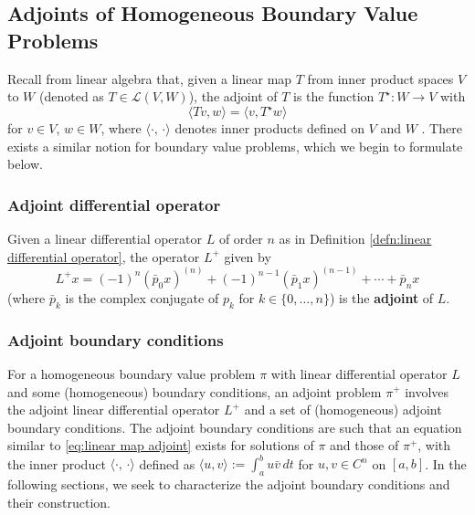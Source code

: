 \documentclass[11pt, oneside, a4paper]{article}
\begin{document}
\subsection{Adjoints of Homogeneous Boundary Value Problems}\label{sec:adjoints_of_homogeneous_BVPs}

Recall from linear algebra that, given a linear map $T$ from inner product spaces $V$ to $W$ (denoted as $T\in\mathcal{L}(V,W)$), the adjoint of $T$ is the function $T^\star:W\to V$ with
\begin{equation}\label{eq:linear map adjoint}
    \langle Tv, w\rangle = \langle v, T^\star w\rangle
\end{equation}
for $v\in V$, $w\in W$, where $\langle \cdot,\,\cdot \rangle$ denotes inner products defined on $V$ and $W$ \cite[p.204]{Axler1997}. There exists a similar notion for boundary value problems, which we begin to formulate below.

\subsubsection{Adjoint differential operator}
\begin{defn}\cite[p.84]{CoddingtonLevinson}\label{defn:adjoint linear differential operator}
    Given a linear differential operator $L$ of order $n$ as in Definition \ref{defn:linear differential operator}, the operator $L^+$ given by
    \[L^+x = (-1)^n (\bar{p}_0 x)^{(n)} + (-1)^{n-1}(\bar{p}_1 x)^{(n-1)} +\cdots +\bar{p}_nx\]
    (where $\bar{p}_k$ is the complex conjugate of $p_k$ for $k\in\{0,\ldots,n\}$) is the \textbf{adjoint} of $L$.
\end{defn}

\subsubsection{Adjoint boundary conditions}
For a homogeneous boundary value problem $\pi$ with linear differential operator $L$ and some (homogeneous) boundary conditions, an adjoint problem $\pi^+$ involves the adjoint linear differential operator $L^+$ and a set of (homogeneous) adjoint boundary conditions. The adjoint boundary conditions are such that an equation similar to \eqref{eq:linear map adjoint} exists for solutions of $\pi$ and those of $\pi^+$, with the inner product $\langle\cdot,\,\cdot\rangle$ defined as $\langle u,v\rangle := \int_a^b u\bar{v}\,dt$ for $u, v\in C^n$ on $[a,b]$. In the following sections, we seek to characterize the adjoint boundary conditions and their construction.
\end{document}

